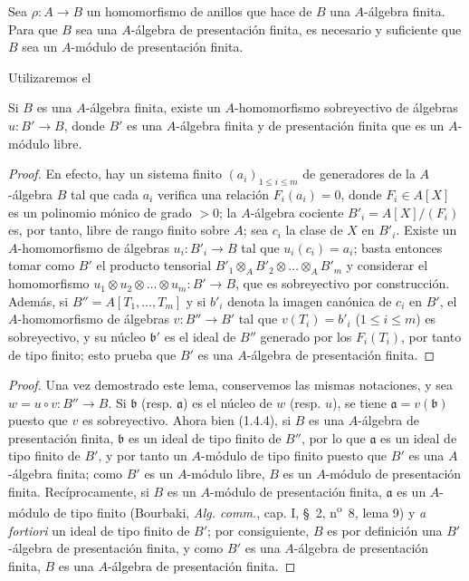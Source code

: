 \begin{proposition}[1.4.7]
\label{IV.1.4.7-fr}
Sea $\rho:A\to B$ un homomorfismo de anillos que hace de $B$ una $A$-álgebra
finita. Para que $B$ sea una $A$-álgebra de presentación finita, es necesario y
suficiente que $B$ sea un $A$-módulo de presentación finita.
\end{proposition}

Utilizaremos el

\begin{lemma}[1.4.7.1]
\label{IV.1.4.7.1-fr}
Si $B$ es una $A$-álgebra finita, existe un $A$-homomorfismo sobreyectivo
de álgebras $u:B'\to B$, donde $B'$ es una $A$-álgebra finita y de presentación
finita que es un $A$-módulo libre.
\end{lemma}

\begin{proof}
En efecto, hay un sistema finito $(a_i)_{1\leq i\leq m}$ de generadores de la
$A$-álgebra $B$ tal que cada $a_i$ verifica una relación $F_i(a_i)=0$, donde
$F_i\in A[X]$ es un polinomio mónico de grado $>0$; la $A$-álgebra cociente
$B'_i=A[X]/(F_i)$ es, por tanto, libre de rango finito sobre $A$; sea $c_i$ la clase de
$X$ en $B'_i$. Existe un $A$-homomorfismo de álgebras $u_i:B'_i\to B$
tal que $u_i(c_i)=a_i$; basta entonces tomar como $B'$ el producto
tensorial $B'_1\otimes_AB'_2\otimes\ldots\otimes_AB'_m$ y considerar
el homomorfismo $u_1\otimes u_2\otimes\ldots\otimes u_m:B'\to B$, que es
sobreyectivo por construcción. Además, si $B''=A[T_1,\ldots,T_m]$ y si $b'_i$
denota la imagen canónica de $c_i$ en $B'$, el $A$-homomorfismo de álgebras
$v:B''\to B'$ tal que $v(T_i)=b'_i$ ($1\leq i\leq m$) es sobreyectivo, y su
núcleo $\mathfrak b'$ es el ideal de $B''$ generado por los $F_i(T_i)$, por tanto de
tipo finito; esto prueba que $B'$ es una $A$-álgebra de presentación finita.
\end{proof}

\begin{proof}
Una vez demostrado este lema, conservemos las mismas notaciones, y sea
$w=u\circ v:B''\to B$. Si $\mathfrak b$ (resp. $\mathfrak a$) es el núcleo de
$w$ (resp. $u$), se tiene $\mathfrak a=v(\mathfrak b)$ puesto que $v$ es sobreyectivo.
Ahora bien (1.4.4), si $B$ es una $A$-álgebra de presentación finita, $\mathfrak b$
es un ideal de tipo finito de $B''$, por lo que $\mathfrak a$ es un ideal de tipo
finito de $B'$, y por tanto un $A$-módulo de tipo finito puesto que $B'$ es una $A$-álgebra
finita; como $B'$ es un $A$-módulo libre, $B$ es un $A$-módulo de
presentación finita. Recíprocamente, si $B$ es un $A$-módulo de presentación
finita, $\mathfrak a$ es un $A$-módulo de tipo finito (Bourbaki,
\emph{Alg. comm.}, cap. I, \S~2, n\textsuperscript{o}~8, lema 9) y
\emph{a fortiori} un ideal de tipo finito de $B'$; por consiguiente, $B$ es por
definición una $B'$-álgebra de presentación finita, y como $B'$ es una
$A$-álgebra de presentación finita, $B$ es una $A$-álgebra de presentación
finita.
\end{proof}

